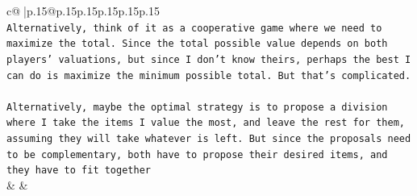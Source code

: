 \documentclass{article}
\begin{document}
{\begin{supertabular}{c@{$\;$}|p{.15\linewidth}@{}p{.15\linewidth}p{.15\linewidth}p{.15\linewidth}p{.15\linewidth}p{.15\linewidth}}
{{{\\ 
\texttt{Alternatively, think of it as a cooperative game where we need to maximize the total. Since the total possible value depends on both players' valuations, but since I don't know theirs, perhaps the best I can do is maximize the minimum possible total. But that's complicated.} \\
\\ 
\texttt{Alternatively, maybe the optimal strategy is to propose a division where I take the items I value the most, and leave the rest for them, assuming they will take whatever is left. But since the proposals need to be complementary, both have to propose their desired items, and they have to fit together} \\
            }
        }
    }
    & & \\ \\


\end{supertabular}}
\end{document}

